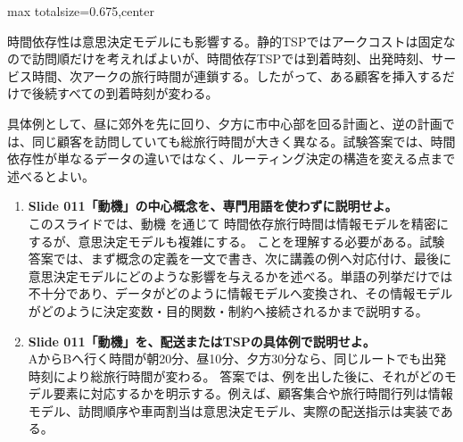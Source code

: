 \begin{adjustbox}{max totalsize={\textwidth}{0.675\textheight},center}
\begin{minipage}{\textwidth}
\begin{minipage}[t]{0.485\textwidth}
時間依存性は意思決定モデルにも影響する。静的TSPではアークコストは固定なので訪問順だけを考えればよいが、時間依存TSPでは到着時刻、出発時刻、サービス時間、次アークの旅行時間が連鎖する。したがって、ある顧客を挿入するだけで後続すべての到着時刻が変わる。\par
具体例として、昼に郊外を先に回り、夕方に市中心部を回る計画と、逆の計画では、同じ顧客を訪問していても総旅行時間が大きく異なる。試験答案では、時間依存性が単なるデータの違いではなく、ルーティング決定の構造を変える点まで述べるとよい。\par
{}
\begin{enumerate}
\item \textbf{Slide 011「動機」の中心概念を、専門用語を使わずに説明せよ。}\\このスライドでは、動機 を通じて 時間依存旅行時間は情報モデルを精密にするが、意思決定モデルも複雑にする。 ことを理解する必要がある。試験答案では、まず概念の定義を一文で書き、次に講義の例へ対応付け、最後に意思決定モデルにどのような影響を与えるかを述べる。単語の列挙だけでは不十分であり、データがどのように情報モデルへ変換され、その情報モデルがどのように決定変数・目的関数・制約へ接続されるかまで説明する。
\item \textbf{Slide 011「動機」を、配送またはTSPの具体例で説明せよ。}\\AからBへ行く時間が朝20分、昼10分、夕方30分なら、同じルートでも出発時刻により総旅行時間が変わる。 答案では、例を出した後に、それがどのモデル要素に対応するかを明示する。例えば、顧客集合や旅行時間行列は情報モデル、訪問順序や車両割当は意思決定モデル、実際の配送指示は実装である。
\end{enumerate}
\end{minipage}
\end{minipage}
\end{adjustbox}

